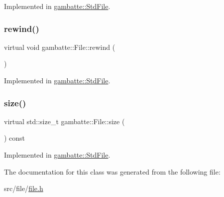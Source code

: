 Implemented in \hyperlink{classgambatte_1_1StdFile_a8c9c0994af30457e852ee887c1f9b38c}{gambatte\+::\+Std\+File}.

\mbox{\label{classgambatte_1_1File_a37e873832be84757982d7a03662dfb95}} 
\subsubsection{\texorpdfstring{rewind()}{rewind()}}
{\footnotesize\ttfamily virtual void gambatte\+::\+File\+::rewind (\begin{DoxyParamCaption}{ }\end{DoxyParamCaption})\hspace{0.3cm}{\ttfamily [pure virtual]}}



Implemented in \hyperlink{classgambatte_1_1StdFile_aa9f4ffbac979a4bf7607992eff78f469}{gambatte\+::\+Std\+File}.

\mbox{\label{classgambatte_1_1File_a589f615d436595eb97cbb9b9dc36632e}} 
\subsubsection{\texorpdfstring{size()}{size()}}
{\footnotesize\ttfamily virtual std\+::size\+\_\+t gambatte\+::\+File\+::size (\begin{DoxyParamCaption}{ }\end{DoxyParamCaption}) const\hspace{0.3cm}{\ttfamily [pure virtual]}}



Implemented in \hyperlink{classgambatte_1_1StdFile_aac486706e2f657b7396757ee9f8e7352}{gambatte\+::\+Std\+File}.



The documentation for this class was generated from the following file\+:\begin{DoxyCompactItemize}
\item 
src/file/\hyperlink{file_8h}{file.\+h}\end{DoxyCompactItemize}
